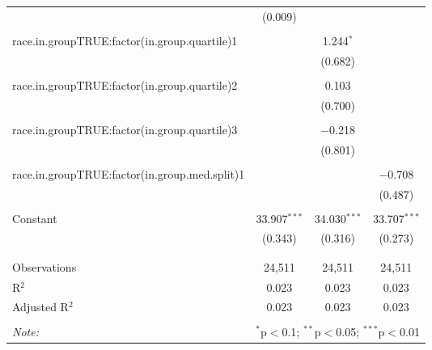\begin{table}[!htbp]
\begin{tabular}{@{\extracolsep{5pt}}lccc}
  & (0.009) &  &  \\ 
  & & & \\ 
 race.in.groupTRUE:factor(in.group.quartile)1 &  & 1.244$^{*}$ &  \\ 
  &  & (0.682) &  \\ 
  & & & \\ 
 race.in.groupTRUE:factor(in.group.quartile)2 &  & 0.103 &  \\ 
  &  & (0.700) &  \\ 
  & & & \\ 
 race.in.groupTRUE:factor(in.group.quartile)3 &  & $-$0.218 &  \\ 
  &  & (0.801) &  \\ 
  & & & \\ 
 race.in.groupTRUE:factor(in.group.med.split)1 &  &  & $-$0.708 \\ 
  &  &  & (0.487) \\ 
  & & & \\ 
 Constant & 33.907$^{***}$ & 34.030$^{***}$ & 33.707$^{***}$ \\ 
  & (0.343) & (0.316) & (0.273) \\ 
  & & & \\ 
\hline \\[-1.8ex] 
Observations & 24,511 & 24,511 & 24,511 \\ 
R$^{2}$ & 0.023 & 0.023 & 0.023 \\ 
Adjusted R$^{2}$ & 0.023 & 0.023 & 0.023 \\ 
\hline 
\hline \\[-1.8ex] 
\textit{Note:}  & \multicolumn{3}{r}{$^{*}$p$<$0.1; $^{**}$p$<$0.05; $^{***}$p$<$0.01} \\ 
\end{tabular} 
\end{table} 
